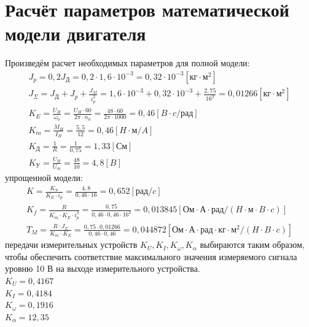 \documentclass[12pt,a4paper]{article}
\begin{document}
\newpage
\section{Расчёт параметров математической модели двигателя}

Произведём расчет необходимых параметров для полной модели:
\begin{gather}
    J_p = 0,2J_\text{Д} = 0,2 \cdot 1,6\cdot10^{-3} = 0,32\cdot10^{-3} [\text{кг}\cdot\text{м}^2]\\
    J_\Sigma = J_\text{Д} + J_p + \frac{J_M}{i_p^2} = 1,6\cdot10^{-3} + 0,32\cdot10^{-3} + \frac{2,75}{16^2} = 0,01266 [\text{кг}\cdot\text{м}^2]\\
    K_E = \frac{U_H}{\omega_0} = \frac{U_H\cdot60}{2\pi\cdot n_0} = \frac{48\cdot60}{2\pi\cdot1000} = 0,46 [B\cdot c/\text{рад}]\\
    K_m = \frac{M_H}{I_H} = \frac{5,5}{12} = 0,46 [H\cdot\text{м}/A]\\
    K_\text{Д} = \frac{1}{R} = \frac{1}{0,75} = 1,33 [\text{См}]\\
    K_\text{У} = \frac{U_H}{U_m} = \frac{48}{10} = 4,8 [B]
\end{gather}
 упрощенной модели:
\begin{gather}
	K = \frac{K_\text{У}}{K_E\cdot i_p} = \frac{4,8}{0,46 \cdot 16} = 0,652 [\text{рад}/c]\\
	K_f = \frac{R}{K_m\cdot K_E\cdot i_p^2} = \frac{0,75}{0,46\cdot0,46\cdot16^2} = 0,013845 [\text{Ом$\cdot$А$\cdot$рад}/(H\cdot\text{м}\cdot B\cdot c)]\\
	T_M = \frac{R\cdot J_\Sigma}{K_m\cdot K_E} = \frac{0,75\cdot0,01266}{0,46\cdot0,46} = 0,044872[\text{Ом$\cdot$А$\cdot$рад$\cdot$кг$\cdot$м$^2$}/(H\cdot B \cdot c)]
\end{gather}
 передачи измерительных устройств $K_U, K_I, K_\omega, K_\alpha$ выбираются таким образом, чтобы обеспечить соответствие максимального значения измеряемого сигнала уровню 10 В на выходе измерительного устройства.\\ 
$K_U = 0,4167$\\
$K_I = 0,4184$\\
$K_\omega = 0,1916$\\
$K_\alpha = 12,35$


\newpage
\end{document}
